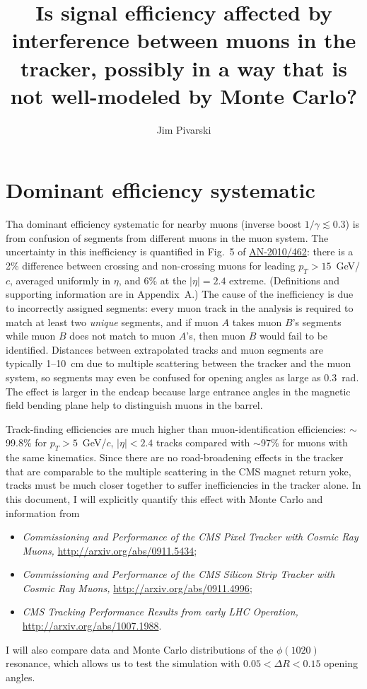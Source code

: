\documentclass[12pt]{article}
\title{Is signal efficiency affected by interference between muons in the tracker, possibly in a way that is not well-modeled by Monte Carlo?}
\author{Jim Pivarski}
\begin{document}
\maketitle

\section{Dominant efficiency systematic}

Tha dominant efficiency systematic for nearby muons (inverse boost
$1/\gamma \lesssim 0.3$) is from confusion of segments from different
muons in the muon system.  The uncertainty in this inefficiency is
quantified in Fig.~5 of
\href{http://cms.cern.ch/iCMS/jsp/iCMS.jsp?mode=single&block=publications}{AN-2010/462}:
there is a 2\% difference between crossing and non-crossing muons for
leading $p_T > 15$~GeV/$c$, averaged uniformly in $\eta$, and 6\% at
the $|\eta| = 2.4$ extreme.  (Definitions and supporting information
are in Appendix~A.)  The cause of the inefficiency is due to
incorrectly assigned segments: every muon track in the analysis is
required to match at least two {\it unique} segments, and if muon $A$
takes muon $B$'s segments while muon $B$ does not match to muon $A$'s,
then muon $B$ would fail to be identified.  Distances between
extrapolated tracks and muon segments are typically 1--10~cm due to
multiple scattering between the tracker and the muon system, so
segments may even be confused for opening angles as large as 0.3~rad.
The effect is larger in the endcap because large entrance angles in
the magnetic field bending plane help to distinguish muons in the
barrel.

Track-finding efficiencies are much higher than muon-identification
efficiencies: $\sim$99.8\% for $p_T > 5$~GeV/$c$, $|\eta| < 2.4$
tracks compared with $\sim$97\% for muons with the same kinematics.
Since there are no road-broadening effects in the tracker that are
comparable to the multiple scattering in the CMS magnet return yoke,
tracks must be much closer together to suffer inefficiencies in the
tracker alone.  In this document, I will explicitly quantify this
effect with Monte Carlo and information from
\begin{itemize}
\item {\it Commissioning and Performance of the CMS Pixel Tracker with
  Cosmic Ray Muons,} \url{http://arxiv.org/abs/0911.5434};
\item {\it Commissioning and Performance of the CMS Silicon Strip
  Tracker with Cosmic Ray Muons,} \url{http://arxiv.org/abs/0911.4996};
\item {\it CMS Tracking Performance Results from early LHC Operation,}
  \url{http://arxiv.org/abs/1007.1988}.
\end{itemize}
I will also compare data and Monte Carlo distributions of the
$\phi(1020)$ resonance, which allows us to test the simulation with
$0.05 < \Delta R < 0.15$ opening angles.
\end{document}

